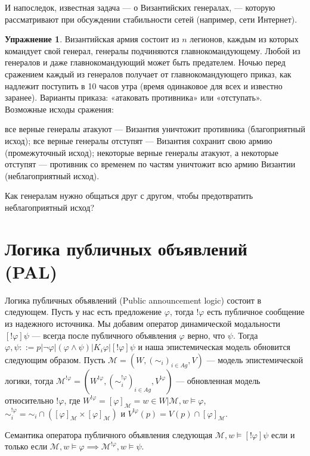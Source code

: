 \documentclass[openany]{book}
\theoremstyle{plain}
\theoremstyle{definition}
\newtheorem{xrc}{Упражнение}[]
\begin{document}
И напоследок, известная задача --- о Византийских генералах, --- которую рассматривают при обсуждении стабильности сетей (например, сети Интернет).
\begin{xrc}
    Византийская армия состоит из \(n\) легионов, каждым из которых командует свой генерал, генералы подчиняются главнокомандующему. Любой из генералов и даже главнокомандующий может быть предателем. Ночью перед сражением каждый из генералов получает от главнокомандующего приказ, как надлежит поступить в 10 часов утра (время одинаковое для всех и известно заранее). Варианты приказа: «атаковать противника» или «отступать». Возможные исходы сражения:
    \begin{itemize}
	 все верные генералы атакуют --- Византия уничтожит противника (благоприятный исход);
	 все верные генералы отступят --- Византия сохранит свою армию (промежуточный исход);
	 некоторые верные генералы атакуют, а некоторые отступят --- противник со временем по частям уничтожит всю армию Византии (неблагоприятный исход).
\end{itemize}

Как генералам нужно общаться друг с другом, чтобы предотвратить неблагоприятный исход?
\end{xrc}

\section{Логика публичных объявлений (PAL)}

Логика публичных объявлений (Public announcement logic) состоит в следующем. Пусть у нас есть предложение \(\varphi\), тогда \(!\varphi\) есть публичное сообщение из надежного источника. Мы добавим оператор динамической модальности \([!\varphi]\psi\) --- всегда после публичного объявления \(\varphi\) верно, что \(\psi\). Тогда \(\varphi, \psi ::= p | \neg \varphi | (\varphi \land \psi) | K_i \varphi | [!\varphi] \psi\) и наша эпистемическая модель обновится следующим образом. Пусть \(\mathcal{M} = (W, (\sim_i)_{i \in Ag}, V)\) --- модель эпистемической логики, тогда \(\mathcal{M}^{!\varphi} = (W^{!\varphi}, (\sim_{i}^{!\varphi})_{i \in Ag}, V^{!\varphi})\) --- обновленная модель относительно \(!\varphi\), где \(W^{!\varphi} = [\varphi]_{\mathcal{M}} = {w \in W | \mathcal{M}, w \models \varphi}\), \(\sim_i^{!\varphi} = \sim_i \cap ([\varphi]_{\mathcal{M}} \times [\varphi]_{\mathcal{M}})\) и \(V^{!\varphi} (p) = V(p) \cap [\varphi]_{\mathcal{M}}\). 

Семантика оператора публичного объявления следующая \(\mathcal{M}, w \models [!\varphi] \psi\) если и только если \(\mathcal{M}, w \models \varphi \implies \mathcal{M}^{!\varphi}, w \models \psi\).
\end{document}
